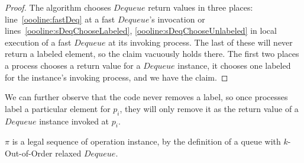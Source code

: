 \documentclass[a4paper,anonymous,USenglish]{lipics-v2021} %
\theoremstyle{definition}
\begin{document}
\begin{proof}
  The algorithm chooses $Dequeue$ return values in three places: line~\ref{oooline:fastDeq} at a fast $Dequeue$'s invocation or lines~\ref{oooline:sDeqChooseLabeled}, \ref{oooline:sDeqChooseUnlabeled} in local execution of a fast $Dequeue$ at its invoking process.  The last of these will never return a labeled element, so the claim vacuously holds there.  The first two places a process chooses a return value for a $Dequeue$ instance, it chooses one labeled for the instance's invoking process, and we have the claim.
\end{proof}

We can further observe that the code never removes a label, so once processes label a particular element for $p_i$, they will only remove it as the return value of a $Dequeue$ instance invoked at $p_i$.

\begin{lemma}
  $\pi$ is a legal sequence of operation instance, by the definition of a queue with $k$-Out-of-Order relaxed $Dequeue$.
\end{lemma}
\end{document}
